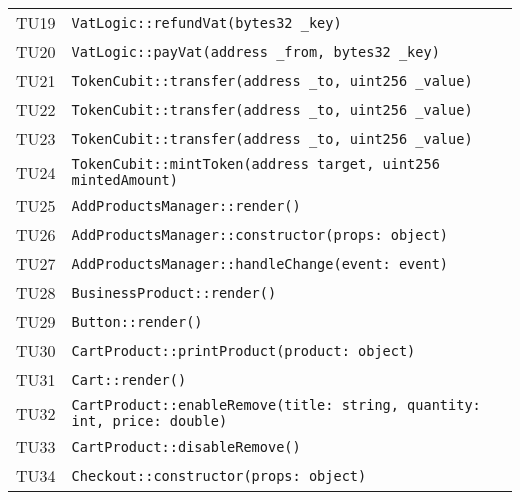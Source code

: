 \begin{longtable}{ >{\centering}p{} >{}p{}}
			\hypertarget{TU19}{TU19} & \texttt{VatLogic::refundVat(bytes32 
				\_key)}\\
			
			\hypertarget{TU20}{TU20} & \texttt{VatLogic::payVat(address \_from, 
			bytes32 \_key)}\\
			
			\hypertarget{TU21}{TU21} & \texttt{TokenCubit::transfer(address 
			\_to, uint256 \_value)}\\
			
			\hypertarget{TU22}{TU22} & \texttt{TokenCubit::transfer(address 
				\_to, uint256 \_value)}\\
			
			\hypertarget{TU23}{TU23} & \texttt{TokenCubit::transfer(address 
				\_to, uint256 \_value)}\\
			
			\hypertarget{TU24}{TU24} & \texttt{TokenCubit::mintToken(address 
			target, uint256 mintedAmount)}\\
		
			\hypertarget{TU25}{TU25} & \texttt{AddProductsManager::render()}\\
			
			\hypertarget{TU26}{TU26} & 
			\texttt{AddProductsManager::constructor(props: object)}\\
			
			\hypertarget{TU27}{TU27} & 
			\texttt{AddProductsManager::handleChange(event: event)}\\
			
			\hypertarget{TU28}{TU28} & 
			\texttt{BusinessProduct::render()}\\
			
			\hypertarget{TU29}{TU29} & 
			\texttt{Button::render()}\\
			
			\hypertarget{TU30}{TU30} & 
			\texttt{CartProduct::printProduct(product: object)}\\
			
			\hypertarget{TU31}{TU31} & 
			\texttt{Cart::render()}\\
			
			\hypertarget{TU32}{TU32} & 
			\texttt{CartProduct::enableRemove(title: string, quantity: int, 
			price: double)}\\
		
			\hypertarget{TU33}{TU33} & 
			\texttt{CartProduct::disableRemove()}\\
			
			\hypertarget{TU34}{TU34} & 
			\texttt{Checkout::constructor(props: object)}\\
			

\end{longtable}

